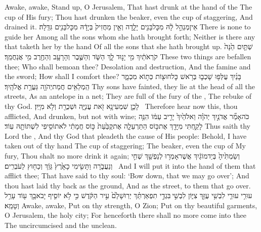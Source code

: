 {Awake, awake, Stand up, O Jerusalem, That hast drunk at the hand of the \lord\space The cup of His fury; Thou hast drunken the beaker, even the cup of staggering, And drained it.}
{אֵין\maqqaf מְנַהֵ֣ל לָ֔הּ מִכׇּל\maqqaf בָּנִ֖ים יָלָ֑דָה וְאֵ֤ין מַחֲזִיק֙ בְּיָדָ֔הּ מִכׇּל\maqqaf בָּנִ֖ים גִּדֵּֽלָה׃}
{There is none to guide her Among all the sons whom she hath brought forth; Neither is there any that taketh her by the hand Of all the sons that she hath brought up.}
{שְׁתַּ֤יִם הֵ֙נָּה֙ קֹרְאֹתַ֔יִךְ מִ֖י יָנ֣וּד לָ֑ךְ הַשֹּׁ֧ד וְהַשֶּׁ֛בֶר וְהָרָעָ֥ב וְהַחֶ֖רֶב מִ֥י אֲנַחֲמֵֽךְ׃}
{These two things are befallen thee; Who shall bemoan thee? Desolation and destruction, And the famine and the sword; How shall I comfort thee?}
{בָּנַ֜יִךְ עֻלְּפ֥וּ שָׁכְב֛וּ בְּרֹ֥אשׁ כׇּל\maqqaf חוּצ֖וֹת כְּת֣וֹא מִכְמָ֑ר הַֽמְלֵאִ֥ים חֲמַת\maqqaf יְהֹוָ֖ה גַּעֲרַ֥ת אֱלֹהָֽיִךְ׃}
{Thy sons have fainted, they lie at the head of all the streets, As an antelope in a net; They are full of the fury of the \lord, The rebuke of thy God.}
{לָכֵ֛ן שִׁמְעִי\maqqaf נָ֥א זֹ֖את עֲנִיָּ֑ה וּשְׁכֻרַ֖ת וְלֹ֥א מִיָּֽיִן׃ \petucha }
{Therefore hear now this, thou afflicted, And drunken, but not with wine;}
{כֹּה\maqqaf אָמַ֞ר אֲדֹנַ֣יִךְ יְהֹוָ֗ה וֵאלֹהַ֙יִךְ֙ יָרִ֣יב עַמּ֔וֹ הִנֵּ֥ה לָקַ֛חְתִּי מִיָּדֵ֖ךְ אֶת\maqqaf כּ֣וֹס הַתַּרְעֵלָ֑ה אֶת\maqqaf קֻבַּ֙עַת֙ כּ֣וֹס חֲמָתִ֔י לֹא\maqqaf תוֹסִ֥יפִי לִשְׁתּוֹתָ֖הּ עֽוֹד׃}
{Thus saith thy Lord the \lord, And thy God that pleadeth the cause of His people: Behold, I have taken out of thy hand The cup of staggering; The beaker, even the cup of My fury, Thou shalt no more drink it again;}
{וְשַׂמְתִּ֙יהָ֙ בְּיַד\maqqaf מוֹגַ֔יִךְ אֲשֶׁר\maqqaf אָמְר֥וּ לְנַפְשֵׁ֖ךְ שְׁחִ֣י וְנַעֲבֹ֑רָה וַתָּשִׂ֤ימִי כָאָ֙רֶץ֙ גֵּוֵ֔ךְ וְכַח֖וּץ לַעֹבְרִֽים׃ \petucha }
{And I will put it into the hand of them that afflict thee; That have said to thy soul: ‘Bow down, that we may go over’; And thou hast laid thy back as the ground, And as the street, to them that go over.}
\newperek
{}
{עוּרִ֥י עוּרִ֛י לִבְשִׁ֥י עֻזֵּ֖ךְ צִיּ֑וֹן לִבְשִׁ֣י \legarmeh  בִּגְדֵ֣י תִפְאַרְתֵּ֗ךְ יְרֽוּשָׁלַ֙͏ִם֙ עִ֣יר הַקֹּ֔דֶשׁ כִּ֣י לֹ֥א יוֹסִ֛יף יָבֹא\maqqaf בָ֥ךְ ע֖וֹד עָרֵ֥ל וְטָמֵֽא׃}
{Awake, awake, Put on thy strength, O Zion; Put on thy beautiful garments, O Jerusalem, the holy city; For henceforth there shall no more come into thee The uncircumcised and the unclean.}
